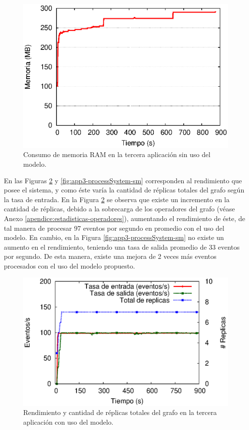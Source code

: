 \begin{figure}[!ht]
\centering
    \includegraphics[scale=0.75]{images/exp/app3/sm/fisical/consumeRAM.eps}
    \caption{Consumo de memoria RAM en la tercera aplicación sin uso del modelo.}
    \label{fig:app3-consumeRAM-sm}
\end{figure}


En las Figuras \ref{fig:app3-processSystem-cm} y \ref{fig:app3-processSystem-sm} \normalsize{corresponden al rendimiento que posee el sistema, y como éste varía la cantidad de réplicas totales del grafo según la tasa de entrada.} En la Figura \ref{fig:app3-processSystem-cm} \normalsize{se observa que existe un incremento en la cantidad de réplicas, debido a la sobrecarga de los operadores del grafo} (véase Anexo \ref{apendice:estadisticas-operadores}), \normalsize{aumentando el rendimiento de éste, de tal manera de procesar 97 eventos por segundo en promedio con el uso del modelo. En cambio, en la Figura} \ref{fig:app3-processSystem-sm} \normalsize{no existe un aumento en el rendimiento, teniendo una tasa de salida promedio de 33 eventos por segundo. De esta manera, existe una mejora de 2 veces más eventos procesados con el uso del modelo propuesto.}

\begin{figure}[!ht]
	\centering
	\includegraphics[scale=0.7]{images/exp/app3/cm/logical/processSystem.eps}
    \caption{Rendimiento y cantidad de réplicas totales del grafo en la tercera aplicación con uso del modelo.}
	\label{fig:app3-processSystem-cm}
\end{figure}

